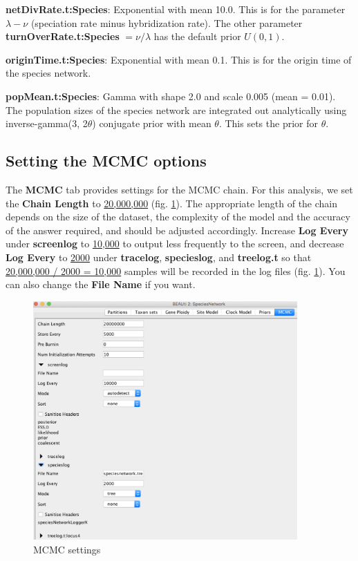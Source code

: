 \documentclass[11pt]{article}
\begin{document}
\textbf{netDivRate.t:Species}: Exponential with mean 10.0. This is for the parameter $\lambda-\nu$ (speciation rate minus hybridization rate). The other parameter \textbf{turnOverRate.t:Species} $=\nu/\lambda$ has the default prior $U(0,1)$.

\textbf{originTime.t:Species}: Exponential with mean 0.1. This is for the origin time of the species network. 

\textbf{popMean.t:Species}: Gamma with shape 2.0 and scale 0.005 (mean = 0.01). The population sizes of the species network are integrated out analytically using inverse-gamma(3, 2$\theta$) conjugate prior with mean $\theta$. This sets the prior for $\theta$.

\subsection*{Setting the MCMC options}

The \textbf{MCMC} tab provides settings for the MCMC chain. For this analysis, we set the \textbf{Chain Length} to \underline{20,000,000} (fig. \ref{fig_mcmc}). The appropriate length of the chain depends on the size of the dataset, the complexity of the model and the accuracy of the answer required, and should be adjusted accordingly. 
Increase \textbf{Log Every} under \textbf{screenlog} to \underline{10,000} to output less frequently to the screen, and decrease \textbf{Log Every} to \underline{2000} under \textbf{tracelog}, \textbf{specieslog}, and \textbf{treelog.t} so that \underline{20,000,000 / 2000 = 10,000} samples will be recorded in the log files (fig. \ref{fig_mcmc}). You can also change the \textbf{File Name} if you want.

\begin{figure}[h]
\center
\includegraphics[width=0.9\textwidth]{figs/fig8_mcmc}
\caption{MCMC settings}
\label{fig_mcmc}
\end{figure}
\end{document}
